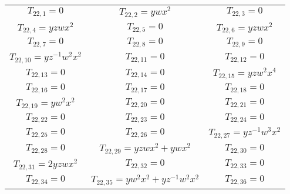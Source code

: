 \begin{longtable}{|c|c|c|}
$T_{22,1}= 0$&

$T_{22,2}= ywx^2$&

$T_{22,3}= 0$\\

$T_{22,4}= yzwx^2$&

$T_{22,5}= 0$&

$T_{22,6}= yzwx^2$\\

$T_{22,7}= 0$&

$T_{22,8}= 0$&

$T_{22,9}= 0$\\

$T_{22,10}= yz^{-1}w^2x^2$&

$T_{22,11}= 0$&

$T_{22,12}= 0$\\

$T_{22,13}= 0$&

$T_{22,14}= 0$&

$T_{22,15}= yzw^2x^4$\\

$T_{22,16}= 0$&

$T_{22,17}= 0$&

$T_{22,18}= 0$\\

$T_{22,19}= yw^2x^2$&

$T_{22,20}= 0$&

$T_{22,21}= 0$\\

$T_{22,22}= 0$&

$T_{22,23}= 0$&

$T_{22,24}= 0$\\

$T_{22,25}= 0$&

$T_{22,26}= 0$&

$T_{22,27}= yz^{-1}w^3x^2$\\

$T_{22,28}= 0$&

$T_{22,29}= yzwx^2+ywx^2$&

$T_{22,30}= 0$\\

$T_{22,31}= 2yzwx^2$&

$T_{22,32}= 0$&

$T_{22,33}= 0$\\

$T_{22,34}= 0$&

$T_{22,35}= yw^2x^2+yz^{-1}w^2x^2$&

$T_{22,36}= 0$\\


\end{longtable}
